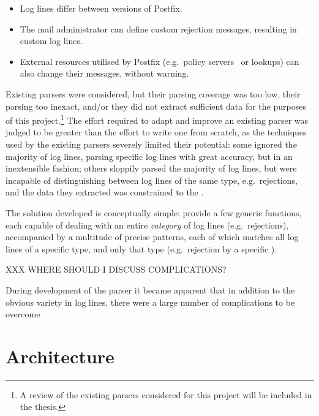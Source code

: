 \documentclass[]{svmult}
\begin{document}
\begin{itemize}

    \item Log lines differ between versions of Postfix.
        
    \item The mail administrator can define custom rejection messages,
        resulting in custom log lines.

    \item External resources utilised by Postfix (e.g.\ policy
        servers~\cite{policy-servers} or \RBL{} lookups) can also change
        their messages, without warning.

\end{itemize}

Existing parsers were considered, but their parsing coverage was too low,
their parsing too inexact, and/or they did not extract sufficient data for
the purposes of this project.\footnote{A review of the existing parsers
considered for this project will be included in the thesis.} The effort
required to adapt and improve an existing parser was judged to be greater
than the effort to write one from scratch, as the techniques used by the
existing parsers severely limited their potential: some ignored the
majority of log lines, parsing specific log lines with great accuracy, but
in an inextensible fashion; others sloppily parsed the majority of log
lines, but were incapable of distinguishing between log lines of the same
type, e.g.\ rejections, and the data they extracted was constrained to the
\LCD{}.

The solution developed is conceptually simple: provide a few generic functions,
each capable of dealing with an entire \textit{category\/} of log lines (e.g.\
rejections), accompanied by a multitude of precise patterns, each of which
matches all log lines of a specific type, and only that type (e.g.\ rejection
by a specific \RBL{}).




XXX WHERE SHOULD I DISCUSS COMPLICATIONS\@?

During development of the parser it became apparent that in addition to the
obvious variety in log lines, there were a large number of complications to
be overcome

\section{Architecture}

\label{Architecture}
\end{document}
